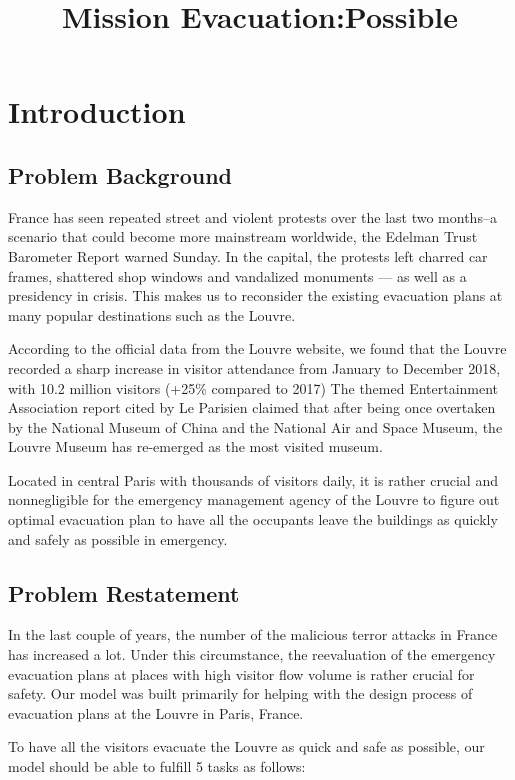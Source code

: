 \documentclass[12pt]{article}
\title{Mission Evacuation:Possible}  %
\begin{document}

\section{Introduction}
\subsection{Problem Background}
France has seen repeated street and violent protests over the last two months–a scenario that could become more mainstream worldwide, the Edelman Trust Barometer Report warned Sunday.\cite{1} In the capital, the protests left charred car frames, shattered shop windows and vandalized monuments — as well as a presidency in crisis. This makes us to reconsider the existing evacuation plans at many popular destinations such as the Louvre.  

According to the official data from the Louvre website, we found that the Louvre recorded a sharp increase in visitor attendance from January to December 2018, with 10.2 million visitors (+25\% compared to 2017)\cite{2} The themed Entertainment Association report cited by Le Parisien claimed that after being once overtaken by the National Museum of China and the National Air and Space Museum, the Louvre Museum has re-emerged as the most visited museum.\cite{3}

Located in central Paris with thousands of visitors daily, it is rather crucial and nonnegligible for the emergency management agency of the Louvre to figure out optimal evacuation plan to have all the occupants leave the buildings as quickly and safely as possible in emergency. 



\subsection{Problem Restatement}

In the last couple of years, the number of the malicious terror attacks in France has increased a lot. Under this circumstance, the reevaluation of the emergency evacuation plans at places with high visitor flow volume is rather crucial for safety. Our model was built primarily for helping with the design process of evacuation plans at the Louvre in Paris, France.  

To have all the visitors evacuate the Louvre as quick and safe as possible, our model should be able to fulfill 5 tasks as follows:
\end{document}

